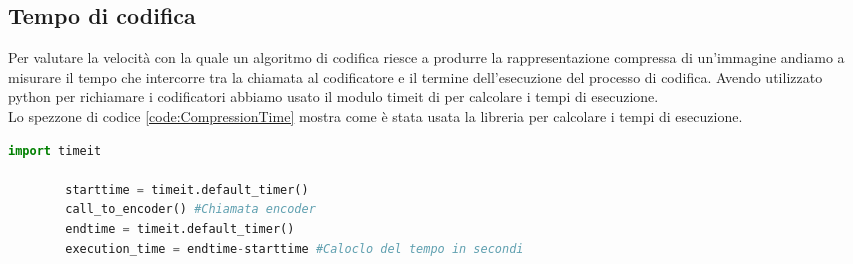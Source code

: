 \subsection{Tempo di codifica}
Per valutare la velocità con la quale un algoritmo di codifica riesce a produrre la rappresentazione compressa di un’immagine andiamo a misurare il tempo che intercorre tra la chiamata al codificatore e il termine dell’esecuzione del processo di codifica. Avendo utilizzato python per richiamare i codificatori abbiamo usato il modulo timeit di per calcolare i tempi di esecuzione.\\
Lo spezzone di codice \ref{code:CompressionTime} mostra come è stata usata la libreria per calcolare i tempi di esecuzione.\\
\begin{adjustbox}{max width=\textwidth}
    \begin{lstlisting}[language=Python, caption=Spezzone di codice per il calcolo del tempo di compressione, label=code:CompressionTime]
        import timeit
        
        starttime = timeit.default_timer()
        call_to_encoder() #Chiamata encoder
        endtime = timeit.default_timer()
        execution_time = endtime-starttime #Caloclo del tempo in secondi
    \end{lstlisting}
\end{adjustbox}

    
